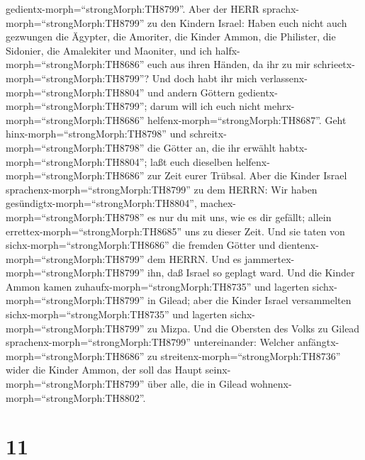 gedientx-morph=``strongMorph:TH8799''.  Aber der HERR
sprachx-morph=``strongMorph:TH8799'' zu den Kindern Israel: Haben euch
nicht auch gezwungen die Ägypter, die Amoriter, die Kinder Ammon, die
Philister,  die Sidonier, die Amalekiter und Maoniter, und
ich halfx-morph=``strongMorph:TH8686'' euch aus ihren Händen, da ihr zu
mir schrieetx-morph=``strongMorph:TH8799''?  Und doch habt
ihr mich verlassenx-morph=``strongMorph:TH8804'' und andern Göttern
gedientx-morph=``strongMorph:TH8799''; darum will ich euch nicht
mehrx-morph=``strongMorph:TH8686'' helfenx-morph=``strongMorph:TH8687''.
 Geht hinx-morph=``strongMorph:TH8798'' und
schreitx-morph=``strongMorph:TH8798'' die Götter an, die ihr erwählt
habtx-morph=``strongMorph:TH8804''; laßt euch dieselben
helfenx-morph=``strongMorph:TH8686'' zur Zeit eurer Trübsal.
 Aber die Kinder Israel
sprachenx-morph=``strongMorph:TH8799'' zu dem HERRN: Wir haben
gesündigtx-morph=``strongMorph:TH8804'',
machex-morph=``strongMorph:TH8798'' es nur du mit uns, wie es dir
gefällt; allein errettex-morph=``strongMorph:TH8685'' uns zu dieser
Zeit.  Und sie taten von sichx-morph=``strongMorph:TH8686''
die fremden Götter und dientenx-morph=``strongMorph:TH8799'' dem HERRN.
Und es jammertex-morph=``strongMorph:TH8799'' ihn, daß Israel so geplagt
ward.  Und die Kinder Ammon kamen
zuhaufx-morph=``strongMorph:TH8735'' und lagerten
sichx-morph=``strongMorph:TH8799'' in Gilead; aber die Kinder Israel
versammelten sichx-morph=``strongMorph:TH8735'' und lagerten
sichx-morph=``strongMorph:TH8799'' zu Mizpa.  Und die
Obersten des Volks zu Gilead sprachenx-morph=``strongMorph:TH8799''
untereinander: Welcher anfängtx-morph=``strongMorph:TH8686'' zu
streitenx-morph=``strongMorph:TH8736'' wider die Kinder Ammon, der soll
das Haupt seinx-morph=``strongMorph:TH8799'' über alle, die in Gilead
wohnenx-morph=``strongMorph:TH8802''.

\hypertarget{section-10}{%
\section{11}\label{section-10}}


